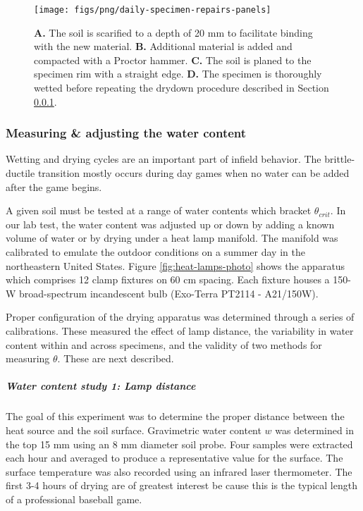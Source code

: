 \documentclass[
  letterpaper,
  openany]{book}
\begin{document}
\begin{figure}

{\centering \texttt{[image: figs/png/daily-specimen-repairs-panels]} 

}

\caption[Repair proces for cleat-mark specimens]{\textbf{A.} The soil is scarified to a depth of 20 mm to facilitate binding with the new material. \textbf{B.} Additional material is added and compacted with a Proctor hammer. \textbf{C.} The soil is planed to the specimen rim with a straight edge. \textbf{D.} The specimen is thoroughly wetted before repeating the drydown procedure described in Section \ref{measuring-and-adjusting-water-content}.}\label{fig:daily-specimen-repair-panels}
\end{figure}

\hypertarget{measuring-and-adjusting-water-content}{%
\subsubsection{Measuring \& adjusting the water content}\label{measuring-and-adjusting-water-content}}

Wetting and drying cycles are an important part of infield behavior.
The brittle-ductile transition mostly occurs during day games when no water can be added after the game begins.

A given soil must be tested at a range of water contents which bracket \(\theta_{crit}\).
In our lab test, the water content was adjusted up or down by adding a known volume of water or by drying under a heat lamp manifold.
The manifold was calibrated to emulate the outdoor conditions on a summer day in the northeastern United States.
Figure \ref{fig:heat-lamps-photo} shows the apparatus which comprises 12 clamp fixtures on 60 cm spacing. Each fixture houses a 150-W broad-spectrum incandescent bulb (Exo-Terra PT2114 - A21/150W).

Proper configuration of the drying apparatus was determined through a series of calibrations.
These measured the effect of lamp distance, the variability in water content within and across specimens, and the validity of two methods for measuring \(\theta\).
These are next described.

\hypertarget{water-content-study-1-lamp-distance}{%
\subparagraph{Water content study 1: Lamp distance}\label{water-content-study-1-lamp-distance}}

The goal of this experiment was to determine the proper distance between the heat source and the soil surface.
Gravimetric water content \(w\) was determined in the top 15 mm using an 8 mm diameter soil probe.
Four samples were extracted each hour and averaged to produce a representative value for the surface.
The surface temperature was also recorded using an infrared laser thermometer.
The first 3-4 hours of drying are of greatest interest be cause this is the typical length of a professional baseball game.
\end{document}

